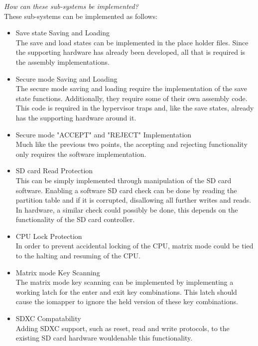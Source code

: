 \textit{How can these sub-systems be implemented?}\\
These sub-systems can be implemented as follows:
\begin{itemize}
\item{Save state Saving and Loading}\\
  The save and load states can be implemented in the place holder files. Since the supporting hardware has already been developed, all that is required is the assembly implementations.\\
\item{Secure mode Saving and Loading}\\
  The secure mode saving and loading require the implementation of the save state functions. Additionally, they require some of their own assembly code. This code is required in the hypervisor traps and, like the save states, already has the supporting hardware around it.\\
\item{Secure mode "ACCEPT" and "REJECT" Implementation}\\
  Much like the previous two points, the accepting and rejecting functionality only requires the software implementation.\\
\item{SD card Read Protection}\\
  This can be simply implemented through manipulation of the SD card software. Enabling a software SD card check can be done by reading the partition table and if it is corrupted, disallowing all further writes and reads. In hardware, a similar check could possibly be done, this depends on the functionality of the SD card controller.\\
\item{CPU Lock Protection}\\
  In order to prevent accidental locking of the CPU, matrix mode could be tied to the halting and resuming of the CPU.\\
\item{Matrix mode Key Scanning}\\
  The matrix mode key scanning can be implemented by implementing a working latch for the enter and exit key combinations. This latch should cause the iomapper to ignore the held version of these key combinations.\\
\item{SDXC Compatability}\\
  Adding SDXC support, such as reset, read and write protocols, to the existing SD card hardware wouldenable this functionality.\\ 
\end{itemize}

